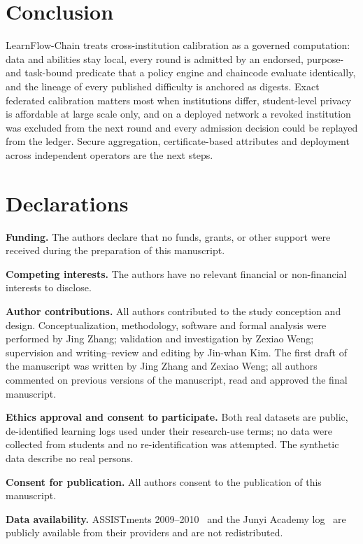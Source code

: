 \documentclass[pdflatex,iicol,sn-mathphys-num]{sn-jnl}
\theoremstyle{thmstyleone}
\begin{document}
\section{Conclusion}\label{sec:conclusion}

LearnFlow-Chain treats cross-institution calibration as a governed computation: data and abilities stay local, every round is admitted by an endorsed, purpose- and task-bound predicate that a policy engine and chaincode evaluate identically, and the lineage of every published difficulty is anchored as digests. Exact federated calibration matters most when institutions differ, student-level privacy is affordable at large scale only, and on a deployed network a revoked institution was excluded from the next round and every admission decision could be replayed from the ledger. Secure aggregation, certificate-based attributes and deployment across independent operators are the next steps.

\section*{Declarations}

\textbf{Funding.} The authors declare that no funds, grants, or other support were received during the
preparation of this manuscript.

\textbf{Competing interests.} The authors have no relevant financial or non-financial interests to
disclose.

\textbf{Author contributions.} All authors contributed to the study conception and design.
Conceptualization, methodology, software and formal analysis were performed by Jing Zhang;
validation and investigation by Zexiao Weng; supervision and writing--review and editing by
Jin-whan Kim. The first draft of the manuscript was written by Jing Zhang and Zexiao Weng; all
authors commented on previous versions of the manuscript, read and approved the final manuscript.

\textbf{Ethics approval and consent to participate.} Both real datasets are public, de-identified
learning logs used under their research-use terms; no data were collected from students and no
re-identification was attempted. The synthetic data describe no real persons.

\textbf{Consent for publication.} All authors consent to the publication of this manuscript.

\textbf{Data availability.} ASSISTments 2009--2010~\cite{feng2009addressing} and the Junyi Academy
log~\cite{junyi2020dataset} are publicly available from their providers and are not redistributed.
\end{document}
